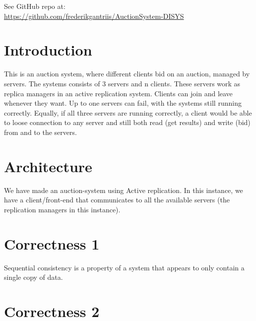 \documentclass[a4paper, 11pt]{article}
\begin{document}
\maketitle
\begin{center}See GitHub repo at:\\
{\Large \url{https://github.com/frederikgantriis/AuctionSystem-DISYS}}
\end{center}

\section{Introduction}
This is an auction system, where different clients bid on an auction, managed by servers. The systems consists of 3 servers and n clients. These servers work as replica managers in an active replication system. Clients can join and leave whenever they want. Up to one servers can fail, with the systems still running correctly. Equally, if all three servers are running correctly, a client would be able to loose connection to any server and still both read (get results) and write (bid) from and to the servers.

\section{Architecture}
We have made an auction-system using Active replication. In this instance, we have a client/front-end that communicates to all the available servers (the replication managers in this instance).

\section{Correctness 1}
Sequential consistency is a property of a system that appears to only contain a single copy of data. 


\section{Correctness 2}
\end{document}
